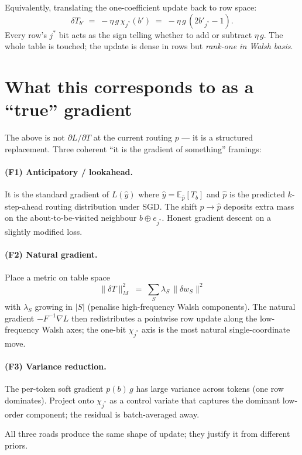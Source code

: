 \documentclass[11pt]{article}
\newcommand{\E}{\mathbb{E}}
\begin{document}
Equivalently, translating the one-coefficient update back to row space:
\[
\boxed{\;\delta T_{b'} \;=\; -\eta\, g\, \chi_{j^*}(b') \;=\; -\eta\, g\,(2 b'_{j^*} - 1).\;}
\]
Every row's $j^*$ bit acts as the sign telling whether to add or subtract $\eta\, g$. The whole table is touched; the update is dense in rows but \emph{rank-one in Walsh basis}.

\section{What this corresponds to as a ``true'' gradient}
\label{sec:framings}

The above is not $\partial L / \partial T$ at the current routing $p$ --- it is a structured replacement. Three coherent ``it is the gradient of something'' framings:

\paragraph{(F1) Anticipatory / lookahead.}
It is the standard gradient of $L(\widehat y)$ where $\widehat y = \E_{\widehat p}[T_b]$ and $\widehat p$ is the predicted $k$-step-ahead routing distribution under SGD. The shift $p \to \widehat p$ deposits extra mass on the about-to-be-visited neighbour $b \oplus e_{j^*}$. Honest gradient descent on a slightly modified loss.

\paragraph{(F2) Natural gradient.}
Place a metric on table space
\[
\|\delta T\|_M^2 \;=\; \sum_S \lambda_S\, \|\delta w_S\|^2
\]
with $\lambda_S$ growing in $|S|$ (penalise high-frequency Walsh components). The natural gradient $-F^{-1} \nabla L$ then redistributes a pointwise row update along the low-frequency Walsh axes; the one-bit $\chi_{j^*}$ axis is the most natural single-coordinate move.

\paragraph{(F3) Variance reduction.}
The per-token soft gradient $p(b)\, g$ has large variance across tokens (one row dominates). Project onto $\chi_{j^*}$ as a control variate that captures the dominant low-order component; the residual is batch-averaged away.

All three roads produce the same shape of update; they justify it from different priors.
\end{document}
